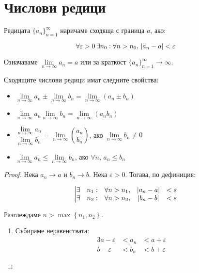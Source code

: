 
\section{Числови редици}

\begin{definition}
    Редицата $\{a_n\}_{n=1}^{\infty}$ наричаме сходяща с граница $a$, ако:

    \[\forall\varepsilon>0\,\exists n_0 : \forall n > n_0,\, \lvert a_n-a\rvert < \varepsilon\]

    Означаваме $\lim\limits_{n\to\infty}a_n = a$ или за краткост $\{a_n\}_{n=1}^{\infty} \to \infty$.
\end{definition}

\begin{theorem}
    Сходящите числови редици имат следните свойства:
    \begin{itemize}
        \item $\lim\limits_{n\to\infty}a_n \pm \lim\limits_{n\to\infty}b_n = \lim\limits_{n\to\infty}\left(a_n\pm b_n\right)$
        \item $\lim\limits_{n\to\infty}a_n\lim\limits_{n\to\infty}b_n = \lim\limits_{n\to\infty}\left(a_n b_n\right)$
        \item $\dfrac{\lim\limits_{n\to\infty}a_n}{\lim\limits_{n\to\infty}b_n} = \lim\limits_{n\to\infty}\left(\dfrac{a_n}{b_n}\right)$, ако $\lim\limits_{n\to\infty}b_n \neq 0$
        \item $\lim\limits_{n\to\infty}a_n \leq \lim\limits_{n\to\infty}b_n$, ако $\forall n,\, a_n \leq b_n$
    \end{itemize}

    \begin{proof}
        Нека $a_n \to a$ и $b_n \to b$. Нека $\varepsilon > 0$. Тогава, по дефиниция:

        \[\left|\begin{matrix}
                \exists & n_1 : & \forall n > n_1, & \lvert a_n-a\rvert & < \varepsilon \\
                \exists & n_2 : & \forall n > n_2, & \lvert b_n-b\rvert & < \varepsilon
            \end{matrix}\right.\]

        Разглеждаме $n > \max\left\{n_1,n_2\right\}$.

        \begin{enumerate}
            \item Събираме неравенствата:
                  \begin{alignat*}{3}
                      a-\varepsilon & < a_n & < a+\varepsilon \\
                      b-\varepsilon & < b_n & < b+\varepsilon
                  \end{alignat*}


\end{enumerate}
\end{proof}
\end{theorem}
